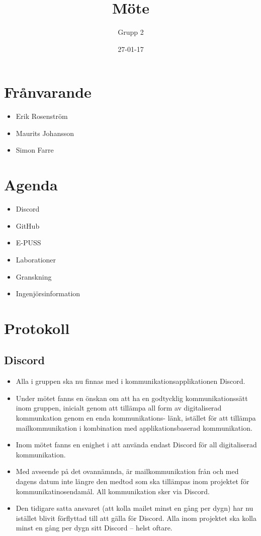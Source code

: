 \documentclass[paper=a4, fontsize=11pt,twoside]{article}
\title{Möte}
\author{Grupp 2}
\date{27-01-17}
\begin{document}
\maketitle	

\section{Frånvarande}
\begin{itemize}
  \item Erik Rosenström
  \item Maurits Johansson
  \item Simon Farre
\end{itemize}

\section{Agenda}

\begin{itemize}
  \item Discord
  \item GitHub
  \item E-PUSS
  \item Laborationer
  \item Granskning
  \item Ingenjörsinformation
\end{itemize}

\section{Protokoll}

\subsection{Discord}
\begin{itemize}
  \item Alla i gruppen ska nu finnas med i kommunikationsapplikationen
Discord.
  \item Under mötet fanns en önskan om att ha en godtycklig
kommunikationssätt inom gruppen, inicialt genom att tillämpa all form av digitaliserad
  kommunkation genom en enda kommunikations- länk, istället för att tillämpa
  mailkommunikation i kombination med applikationsbaserad kommunikation.
  \item Inom mötet fanns en enighet i att använda endast Discord för all
  digitaliserad kommunikation. 
  \item Med avseende på det ovannämnda, är mailkommunikation från och med
dagens datum inte längre den medtod som ska tillämpas inom projektet för kommunikatinosendamål. All kommunikation sker via Discord.
  \item Den tidigare satta ansvaret (att kolla mailet minst en gång per
dygn) har nu istället blivit förflyttad till att gälla för Discord. Alla inom projektet ska kolla minst en gång per dygn sitt Discord – helst oftare.
\end{itemize}
\end{document}
